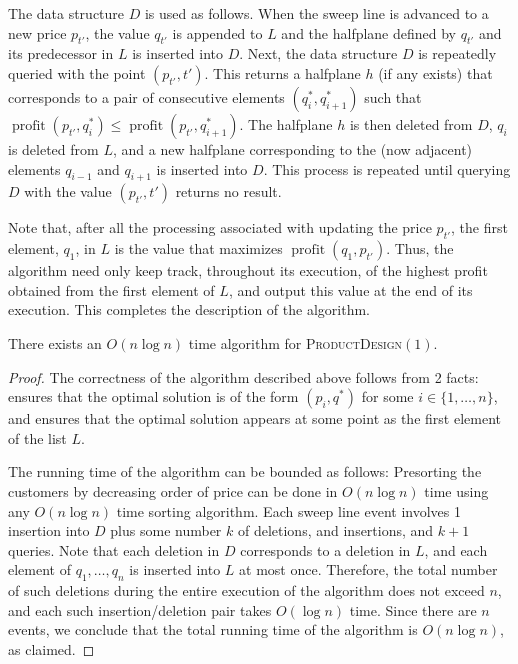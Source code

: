 \documentclass[lotsofwhite]{patmorin}
\newcommand{\val}{\operatorname{profit}}
\begin{document}
The data structure $D$ is used as follows.  When the sweep line is
advanced to a new price $p_{t'}$, the value $q_{t'}$ is appended to
$L$ and the halfplane defined by $q_{t'}$ and its predecessor in $L$
is inserted into $D$.  Next, the data structure $D$ is repeatedly
queried with the point $(p_{t'},t')$.  This returns a halfplane
$h$ (if any exists) that corresponds to a pair of consecutive
elements $(q_i^*,q_{i+1}^*)$ such that $\val(p_{t'},q_i^*) \le
\val(p_{t'},q_{i+1}^*)$.  The halfplane $h$ is then deleted from $D$,
$q_{i}$ is deleted from $L$, and a new halfplane corresponding to the
(now adjacent) elements $q_{i-1}$ and $q_{i+1}$ is inserted into $D$.
This process is repeated until querying $D$ with the value $(p_{t'},t')$
returns no result.

Note that, after all the processing associated with updating the price
$p_{t'}$, the first element, $q_1$, in $L$ is the value that maximizes
$\val(q_1,p_{t'})$. Thus, the algorithm need only keep track, throughout
its execution, of the highest profit obtained from the first element of
$L$, and output this value at the end of its execution.  This completes
the description of the algorithm.

\begin{thm}
  There exists an $O(n\log n)$ time algorithm for
  \textsc{ProductDesign$(1)$}.
\end{thm}

\begin{proof}
  The correctness of the algorithm described above follows from 2 facts:
   ensures that the optimal solution is of the form
  $(p_i,q^*)$ for some $i\in\{1,\ldots,n\}$, and 
  ensures that the optimal solution appears at some point as the first
  element of the list $L$.

  The running time of the algorithm can be bounded as follows: Presorting
  the customers by decreasing order of price can be done in $O(n\log n)$
  time using any $O(n\log n)$ time sorting algorithm. Each sweep line
  event involves 1 insertion into $D$ plus some number $k$ of deletions,
  and insertions, and $k+1$ queries.  Note that each deletion in $D$
  corresponds to a deletion in $L$, and each element of $q_1,\ldots,q_n$
  is inserted into $L$ at most once.  Therefore, the total number of such
  deletions during the entire execution of the algorithm does not exceed
  $n$, and each such insertion/deletion pair takes $O(\log n)$ time.
  Since there are $n$ events, we conclude that the total running time
  of the algorithm is $O(n\log n)$, as claimed.
\end{proof}
\end{document}
